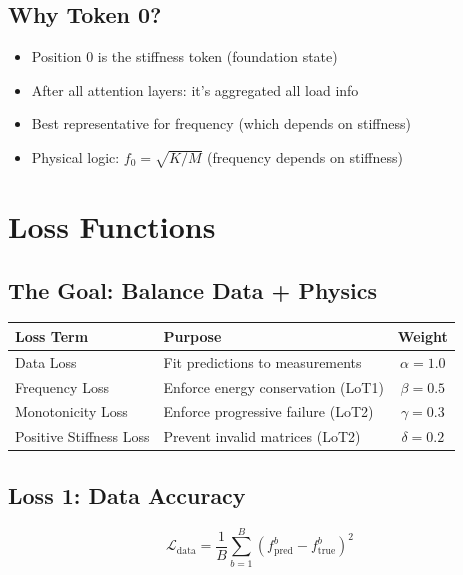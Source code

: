 \documentclass[11pt,a4paper]{article}
\begin{document}
\subsection{Why Token 0?}

\begin{itemize}
  \item Position 0 is the stiffness token (foundation state)
  \item After all attention layers: it's aggregated all load info
  \item Best representative for frequency (which depends on stiffness)
  \item Physical logic: $f_0 = \sqrt{K/M}$ (frequency depends on stiffness)
\end{itemize}

\newpage
\section{Loss Functions}

\subsection{The Goal: Balance Data + Physics}

\begin{table}[H]
\centering
\begin{tabular}{|l|l|c|}
\hline
\textbf{Loss Term} & \textbf{Purpose} & \textbf{Weight} \\
\hline
Data Loss & Fit predictions to measurements & $\alpha = 1.0$ \\
\hline
Frequency Loss & Enforce energy conservation (LoT1) & $\beta = 0.5$ \\
\hline
Monotonicity Loss & Enforce progressive failure (LoT2) & $\gamma = 0.3$ \\
\hline
Positive Stiffness Loss & Prevent invalid matrices (LoT2) & $\delta = 0.2$ \\
\hline
\end{tabular}
\end{table}

\subsection{Loss 1: Data Accuracy}

\begin{equation}
\mathcal{L}_{\text{data}} = \frac{1}{B}\sum_{b=1}^{B} (f_{\text{pred}}^b - f_{\text{true}}^b)^2
\end{equation}
\end{document}
